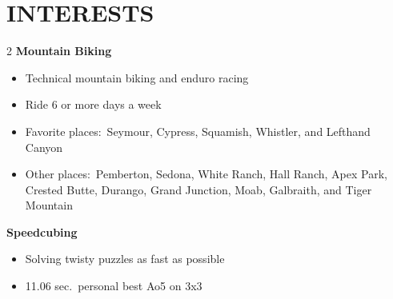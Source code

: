 \documentclass[final]{Resume-Format}
\begin{document}
\section{INTERESTS}
\begin{mdframed}[linecolor=white!20!orange,linewidth=2pt,topline=false,bottomline=false,rightline=false]
	\vspace{-\multicolsep}
	\begin{multicols}{2}
		\textbf{Mountain Biking}
		\begin{itemize}
			\item Technical mountain biking and enduro racing
			\item Ride 6 or more days a week
			\item Favorite places:\ Seymour, Cypress, Squamish, Whistler, and Lefthand Canyon
			\item Other places:\ Pemberton, Sedona, White Ranch, Hall Ranch, Apex Park, Crested Butte, Durango, Grand Junction, Moab, Galbraith, and Tiger Mountain
		\end{itemize}

		\vspace{6pt}

		\textbf{Speedcubing}
		\begin{itemize}
			\item Solving twisty puzzles as fast as possible
			\item 11.06 sec.\ personal best Ao5 on 3x3
		\end{itemize}

	\end{multicols}
\end{mdframed}
\end{document}
